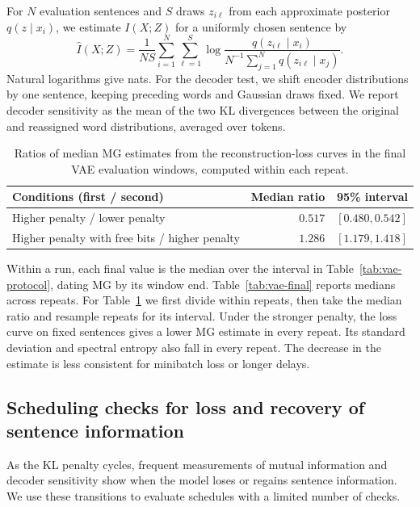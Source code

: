 {For $N$ evaluation sentences and $S$ draws $z_{i\ell}$ from each approximate posterior $q(z\mid x_i)$, we estimate $I(X;Z)$ for a uniformly chosen sentence by
\begin{equation}
\widehat I(X;Z)=\frac{1}{NS}\sum_{i=1}^N\sum_{\ell=1}^S
\log\frac{q(z_{i\ell}\mid x_i)}{N^{-1}\sum_{j=1}^N q(z_{i\ell}\mid x_j)}.
\label{eq:vae-mi}
\end{equation}
Natural logarithms give nats. For the decoder test, we shift encoder distributions by one sentence, keeping preceding words and Gaussian draws fixed. We report decoder sensitivity as the mean of the two KL divergences between the original and reassigned word distributions, averaged over tokens.


\begin{table}[htbp]
\centering\small
\caption{Ratios of median MG estimates from the reconstruction-loss curves in the final VAE evaluation windows, computed within each repeat.}
\label{tab:vae-mg-ratios}
\begin{tabularx}{\linewidth}{@{}>{\raggedright\arraybackslash}Xrr@{}}
\toprule
Conditions (first / second) & Median ratio & 95\% interval \\
\midrule
Higher penalty / lower penalty & $0.517$ & $[0.480,0.542]$ \\
Higher penalty with free bits / higher penalty & $1.286$ & $[1.179,1.418]$ \\
\bottomrule
\end{tabularx}
\end{table}

\begin{table}[!htbp]
\centering\small
\caption{Mutual information, decoder sensitivity and the MG estimate from the reconstruction-loss curve in the final evaluation interval.}
\label{tab:vae-final}

\end{table}

Within a run, each final value is the median over the interval in Table~\ref{tab:vae-protocol}, dating MG by its window end. Table~\ref{tab:vae-final} reports medians across repeats. For Table~\ref{tab:vae-mg-ratios} we first divide within repeats, then take the median ratio and resample repeats for its interval. Under the stronger penalty, the loss curve on fixed sentences gives a lower MG estimate in every repeat. Its standard deviation and spectral entropy also fall in every repeat. The decrease in the estimate is less consistent for minibatch loss or longer delays.


\subsection[Scheduling checks for loss and recovery of sentence information]{Scheduling checks for loss and recovery of sentence information}
As the KL penalty cycles, frequent measurements of mutual information and decoder sensitivity show when the model loses or regains sentence information. We use these transitions to evaluate schedules with a limited number of checks.

}
